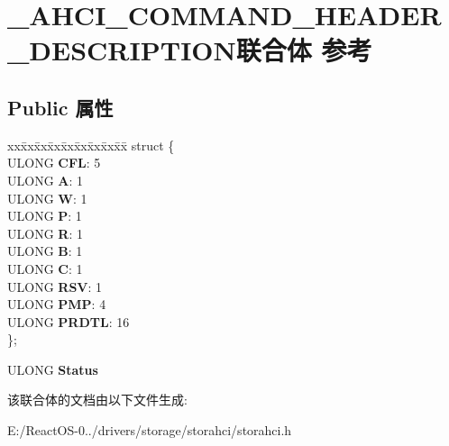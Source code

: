\hypertarget{union___a_h_c_i___c_o_m_m_a_n_d___h_e_a_d_e_r___d_e_s_c_r_i_p_t_i_o_n}{}\section{\+\_\+\+A\+H\+C\+I\+\_\+\+C\+O\+M\+M\+A\+N\+D\+\_\+\+H\+E\+A\+D\+E\+R\+\_\+\+D\+E\+S\+C\+R\+I\+P\+T\+I\+O\+N联合体 参考}
\label{union___a_h_c_i___c_o_m_m_a_n_d___h_e_a_d_e_r___d_e_s_c_r_i_p_t_i_o_n}
\subsection*{Public 属性}
\begin{DoxyCompactItemize}
\item 
\mbox{\label{union___a_h_c_i___c_o_m_m_a_n_d___h_e_a_d_e_r___d_e_s_c_r_i_p_t_i_o_n_a99ebd3da0e87478f39a22ed4ee29833a}} 
\begin{tabbing}
xx\=xx\=xx\=xx\=xx\=xx\=xx\=xx\=xx\=\kill
struct \{\\
\>ULONG {\bfseries CFL}: 5\\
\>ULONG {\bfseries A}: 1\\
\>ULONG {\bfseries W}: 1\\
\>ULONG {\bfseries P}: 1\\
\>ULONG {\bfseries R}: 1\\
\>ULONG {\bfseries B}: 1\\
\>ULONG {\bfseries C}: 1\\
\>ULONG {\bfseries RSV}: 1\\
\>ULONG {\bfseries PMP}: 4\\
\>ULONG {\bfseries PRDTL}: 16\\
\}; \\

\end{tabbing}\item 
\mbox{\label{union___a_h_c_i___c_o_m_m_a_n_d___h_e_a_d_e_r___d_e_s_c_r_i_p_t_i_o_n_aeef9090a126440a147470d19a3ca4cd3}} 
U\+L\+O\+NG {\bfseries Status}
\end{DoxyCompactItemize}


该联合体的文档由以下文件生成\+:\begin{DoxyCompactItemize}
\item 
E\+:/\+React\+O\+S-\/0../drivers/storage/storahci/storahci.\+h\end{DoxyCompactItemize}
